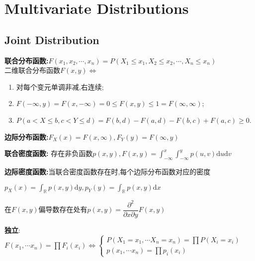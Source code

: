 \section{Multivariate Distributions}
\subsection{Joint Distribution}
\textbf{联合分布函数:}$ F(x_1,x_2,\cdots, x_n) = P(X_1\le x_1,X_2\le x_2,\cdots,X_n\le x_n)$
\\

二维联合分布函数$ F(x,y)\Leftrightarrow $
\begin{enumerate}
  \item 对每个变元单调非减,右连续;

  \item $ F(-\infty,y) = F(x,-\infty)= 0\le F(x,y)\le 1= F(\infty,\infty)$;

  \item $ P(a<X\le b, c<Y\le d) = F(b,d)-F(a,d)-F(b,c)+F(a,c)\ge 0$.

\end{enumerate}

\textbf{边际分布函数:}$ F_X(x) = F(x,\infty), F_Y(y) = F(\infty,y)$

\textbf{联合密度函数:} 存在非负函数$ p(x,y), F(x,y) = \int_{-\infty}^x{\int_{-\infty}^y{p(u,v)\mathrm{d}u\mathrm{d}v}}$

\textbf{边际密度函数:}当联合密度函数存在时,每个边际分布函数对应的密度

$ p_X(x) = \int_{\mathbb{R}}p(x,y)\mathrm{d}y,p_Y(y) = \int_{\mathbb{R}}{p(x,y)\mathrm{d}x}$

在$ F(x,y)$偏导数存在处有$ p(x,y) = \dfrac{\partial^2}{\partial x\partial y}F(x,y)$

\textbf{独立}:$ F(x_1,\cdots x_n)=\prod{F_i(x_i)}\Leftrightarrow \begin{cases} P(X_1=x_1,\cdots X_n=x_n)=\prod{P(X_i=x_i)}\\ p(x_1,\cdots x_n)=\prod{p_i(x_i)}\end{cases}$

